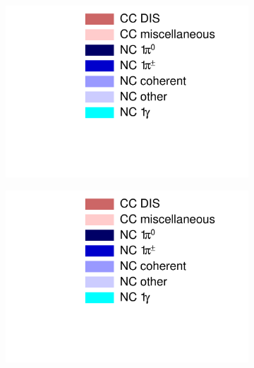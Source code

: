 \begin{figure}[!htbp]
\begin{subfigure}{.24\textwidth}
\end{subfigure}
\begin{subfigure}{.24\textwidth}
  \centering
  \includegraphics[width=\linewidth, trim={5mm 60mm 30mm 0mm}, clip]{figs/legend2}
\end{subfigure}
\begin{subfigure}{.24\textwidth}
  \centering
  \includegraphics[width=\linewidth, trim={5mm 0mm 30mm 80mm}, clip]{figs/legend2}
\end{subfigure}


\end{figure}
